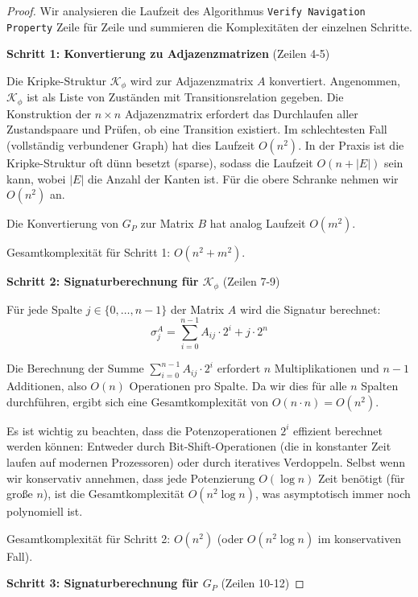 ﻿\documentclass[a4paper,12pt]{article}
\theoremstyle{definition}
\begin{document}
\begin{proof}
Wir analysieren die Laufzeit des Algorithmus \texttt{Verify Navigation Property} Zeile für Zeile und summieren die Komplexitäten der einzelnen Schritte.

\textbf{Schritt 1: Konvertierung zu Adjazenzmatrizen} (Zeilen 4-5)

Die Kripke-Struktur $\mathcal{K}_{\phi}$ wird zur Adjazenzmatrix $A$ konvertiert. Angenommen, $\mathcal{K}_{\phi}$ ist als Liste von Zuständen mit Transitionsrelation gegeben. Die Konstruktion der $n \times n$ Adjazenzmatrix erfordert das Durchlaufen aller Zustandspaare und Prüfen, ob eine Transition existiert. Im schlechtesten Fall (vollständig verbundener Graph) hat dies Laufzeit $O(n^2)$. In der Praxis ist die Kripke-Struktur oft dünn besetzt (sparse), sodass die Laufzeit $O(n + |E|)$ sein kann, wobei $|E|$ die Anzahl der Kanten ist. Für die obere Schranke nehmen wir $O(n^2)$ an.

Die Konvertierung von $G_P$ zur Matrix $B$ hat analog Laufzeit $O(m^2)$.

Gesamtkomplexität für Schritt 1: $O(n^2 + m^2)$.

\textbf{Schritt 2: Signaturberechnung für $\mathcal{K}_{\phi}$} (Zeilen 7-9)

Für jede Spalte $j \in \{0, \ldots, n-1\}$ der Matrix $A$ wird die Signatur berechnet:
\begin{equation}
\sigma_j^A = \sum_{i=0}^{n-1} A_{ij} \cdot 2^i + j \cdot 2^n
\end{equation}

Die Berechnung der Summe $\sum_{i=0}^{n-1} A_{ij} \cdot 2^i$ erfordert $n$ Multiplikationen und $n-1$ Additionen, also $O(n)$ Operationen pro Spalte. Da wir dies für alle $n$ Spalten durchführen, ergibt sich eine Gesamtkomplexität von $O(n \cdot n) = O(n^2)$.

Es ist wichtig zu beachten, dass die Potenzoperationen $2^i$ effizient berechnet werden können: Entweder durch Bit-Shift-Operationen (die in konstanter Zeit laufen auf modernen Prozessoren) oder durch iteratives Verdoppeln. Selbst wenn wir konservativ annehmen, dass jede Potenzierung $O(\log n)$ Zeit benötigt (für große $n$), ist die Gesamtkomplexität $O(n^2 \log n)$, was asymptotisch immer noch polynomiell ist.

Gesamtkomplexität für Schritt 2: $O(n^2)$ (oder $O(n^2 \log n)$ im konservativen Fall).

\textbf{Schritt 3: Signaturberechnung für $G_P$} (Zeilen 10-12)


\end{proof}
\end{document}
